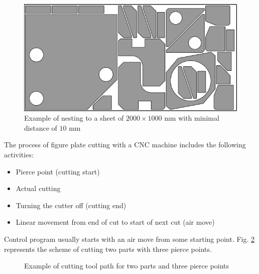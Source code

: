 \documentclass{../download/tPRS2e}
\begin{document}
\begin{figure}[h]
    \begin{center}
    \includegraphics{nesting.png}
    \caption{Example of nesting to a sheet of $2000 \times 1000$ mm
    with minimal distance of $10$ mm} \label{nesting}
    \end{center}
\end{figure}

The process of figure plate cutting with a CNC machine includes
the following activities:
\begin{itemize}
    \item{Pierce point} (cutting start)
    \item{Actual cutting}
    \item{Turning the cutter off} (cutting end)
    \item{Linear movement from end of cut to start of next cut} (air move)
\end{itemize}

Control program usually starts with an air move from
some starting point. Fig. \ref{toolpath} represents
the scheme of cutting two parts with three pierce points.

\begin{figure}[h]
\begin{center}
\caption{Example of cutting tool path for two parts and three pierce points} \label{toolpath}
\end{center}    
\end{figure}
\end{document}
